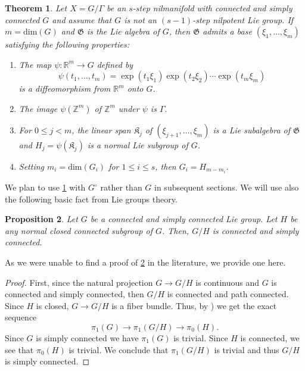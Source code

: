 \documentclass[letter, 11pt]{article}
\newtheorem{theorem}{Theorem}[section]
\newtheorem{proposition}[theorem]{Proposition}
\theoremstyle{definition}
\theoremstyle{plain}
\newcommand{\Z}{\mathbb{Z}}
\newcommand{\R}{\mathbb{R}}
\newcommand{\1}{\mathbbm{1}}
\begin{document}
\begin{theorem}\label{malcev}
    Let $X=G/\Gamma$ be an $s$-step nilmanifold with connected and simply connected $G$ and assume that $G$ is not an $(s-1)$-step nilpotent Lie group. If $m=\text{dim}(G)$ and $\mathfrak{G}$ is the Lie algebra of $G$, then $\mathfrak{G}$ admits a base $(\xi_1,\ldots,\xi_m)$ satisfying the following properties:
    \begin{enumerate}
        \item The map $\psi:\R^m\to G $ defined by 
$$\psi(t_1,\ldots,t_m)=\exp(t_1\xi_1)\exp(t_2\xi_2)\cdots \exp(t_m\xi_m) $$
is a diffeomorphism from $\R^m$ onto $G$.
\item The image $\psi(\Z^m)$ of $\Z^m$ under $\psi$ is $\Gamma.$
\item For $0\leq j<m$, the linear span $\mathfrak{K}_j$ of $(\xi_{j+1},\ldots,\xi_m)$ is a Lie subalgebra of $\mathfrak{G}$ and $H_j=\psi(\mathfrak{K}_j)$ is a normal Lie subgroup of $G$.
\item Setting $m_i=\text{dim}(G_i)$ for $1\leq i \leq s$, then $G_i=H_{m-m_i}$.
    \end{enumerate}
\end{theorem}
We plan to use \cref{malcev} with $G^\circ$ rather than $G$ in subsequent sections. We will use also the following basic fact from Lie groups theory.
\begin{proposition}\label{connectedness-quotient}
        Let $G$ be a connected and simply connected Lie group. Let $H$ be any normal closed connected subgroup of $G$. Then, $G/H$ is connected and simply connected. 
\end{proposition}
As we were unable to find a proof of \cref{connectedness-quotient} in the literature, we provide one here.
\begin{proof}
    First, since the natural projection $G\to G/H$ is continuous and $G$ is connected and simply connected, then $G/H$ is connected and path connected. Since $H$ is closed, $G\to G/H$ is a fiber bundle. Thus, by \cite[Theorem 4.41 and Proposition 4.48]{HatcherAT}) we get the exact sequence
    $$\pi_1(G)\to \pi_1(G/H)\to \pi_0(H) .$$
    Since $G$ is simply connected we have $\pi_1(G)$ is trivial. Since $H$ is connected, we see that $\pi_0(H)$ is trivial. We conclude that $\pi_1(G/H)$ is trivial and thus $G/H$ is simply connected. 
\end{proof}
\end{document}
